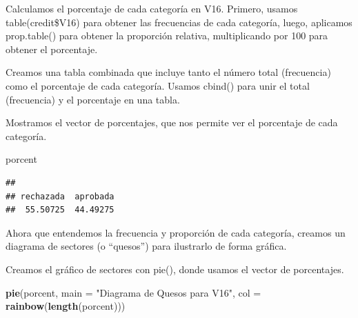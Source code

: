 \documentclass[
]{article}
\newenvironment{Shaded}{\begin{snugshade}}{\end{snugshade}}
\newcommand{\AttributeTok}[1]{\textcolor[rgb]{0.13,0.29,0.53}{#1}}
\newcommand{\DecValTok}[1]{\textcolor[rgb]{0.00,0.00,0.81}{#1}}
\newcommand{\FunctionTok}[1]{\textcolor[rgb]{0.13,0.29,0.53}{\textbf{#1}}}
\newcommand{\NormalTok}[1]{#1}
\newcommand{\OtherTok}[1]{\textcolor[rgb]{0.56,0.35,0.01}{#1}}
\newcommand{\SpecialCharTok}[1]{\textcolor[rgb]{0.81,0.36,0.00}{\textbf{#1}}}
\newcommand{\StringTok}[1]{\textcolor[rgb]{0.31,0.60,0.02}{#1}}
\begin{document}
Calculamos el porcentaje de cada categoría en V16. Primero, usamos
table(credit\$V16) para obtener las frecuencias de cada categoría,
luego, aplicamos prop.table() para obtener la proporción relativa,
multiplicando por 100 para obtener el porcentaje.

\begin{Shaded}
\end{Shaded}

Creamos una tabla combinada que incluye tanto el número total
(frecuencia) como el porcentaje de cada categoría. Usamos cbind() para
unir el total (frecuencia) y el porcentaje en una tabla.

\begin{Shaded}
\end{Shaded}

Mostramos el vector de porcentajes, que nos permite ver el porcentaje de
cada categoría.

\begin{Shaded}
\begin{Highlighting}[]
\NormalTok{porcent}
\end{Highlighting}
\end{Shaded}

\begin{verbatim}
## 
## rechazada  aprobada 
##  55.50725  44.49275
\end{verbatim}

Ahora que entendemos la frecuencia y proporción de cada categoría,
creamos un diagrama de sectores (o ``quesos'') para ilustrarlo de forma
gráfica.

Creamos el gráfico de sectores con pie(), donde usamos el vector de
porcentajes.

\begin{Shaded}
\begin{Highlighting}[]
\FunctionTok{pie}\NormalTok{(porcent, }\AttributeTok{main =} \StringTok{"Diagrama de Quesos para V16"}\NormalTok{, }\AttributeTok{col =} \FunctionTok{rainbow}\NormalTok{(}\FunctionTok{length}\NormalTok{(porcent)))}
\end{Highlighting}
\end{Shaded}
\end{document}
